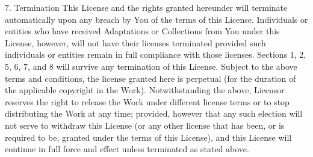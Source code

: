 \documentclass[oneside]{book}
\begin{document}
7. Termination
This License and the rights granted hereunder will terminate automatically upon
any breach by You of the terms of this License. Individuals or entities who have
received Adaptations or Collections from You under this License, however, will
not have their licenses terminated provided such individuals or entities remain
in full compliance with those licenses. Sections 1, 2, 5, 6, 7, and 8 will
survive any termination of this License.
Subject to the above terms and conditions, the license granted here is perpetual
(for the duration of the applicable copyright in the Work). Notwithstanding the
above, Licensor reserves the right to release the Work under different license
terms or to stop distributing the Work at any time; provided, however that any
such election will not serve to withdraw this License (or any other license that
has been, or is required to be, granted under the terms of this License), and
this License will continue in full force and effect unless terminated as stated
above.
\end{document}
